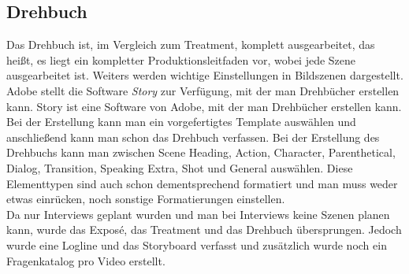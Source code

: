 \subsection{Drehbuch}
Das Drehbuch ist, im Vergleich zum Treatment, komplett ausgearbeitet, das heißt, es liegt ein kompletter Produktionsleitfaden vor, wobei jede Szene ausgearbeitet ist. Weiters werden wichtige Einstellungen in Bildszenen dargestellt. Adobe stellt die Software \textit{Story} zur Verfügung, mit der man Drehbücher erstellen kann.\citep{drehbuch}\newline
Story ist eine Software von Adobe, mit der man Drehbücher erstellen kann. Bei der Erstellung kann man ein vorgefertigtes Template auswählen und anschließend kann man schon das Drehbuch verfassen. Bei der Erstellung des Drehbuchs kann man zwischen Scene Heading, Action, Character, Parenthetical, Dialog, Transition, Speaking Extra, Shot und General auswählen. Diese Elementtypen sind auch schon dementsprechend formatiert und man muss weder etwas einrücken, noch sonstige Formatierungen einstellen.\citep{drehbuchZwei}\\ 
Da nur Interviews geplant wurden und man bei Interviews keine Szenen planen kann, wurde das Expos\'{e}, das Treatment und das Drehbuch übersprungen. Jedoch wurde eine Logline und das Storyboard verfasst und zusätzlich wurde noch ein Fragenkatalog pro Video erstellt. 
